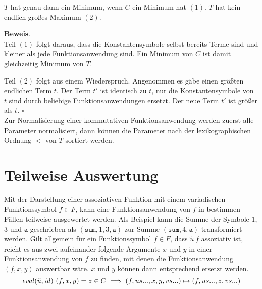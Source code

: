 \begin{lemma} \label{lemMinMax}
$T$ hat genau dann ein Minimum, wenn $C$ ein Minimum hat $(1)$. $T$ hat kein endlich großes Maximum $(2)$.
\end{lemma}

\textbf{Beweis}.\\
Teil $(1)$ folgt daraus, dass die Konstantensymbole selbst bereits Terme sind und kleiner als jede Funktionsanwendung sind. Ein Minimum von $C$ ist damit gleichzeitig Minimum von $T$.

Teil $(2)$ folgt aus einem Wiederspruch. Angenommen es gäbe einen größten endlichen Term $t$. Der Term $t'$ ist identisch zu $t$, nur die Konstantensymbole von $t$ sind durch beliebige Funktionsanwendungen ersetzt. Der neue Term $t'$ ist größer als $t$.
\hfill $\square$\\

Zur Normalisierung einer kommutativen Funktionsanwendung werden zuerst alle Parameter normalisiert, dann können die Parameter nach der lexikographischen Ordnung $<$ von $T$ sortiert werden. 

\section{Teilweise Auswertung} \label{subsecNormalKombinieren}

\begin{algorithm}
\DontPrintSemicolon
\caption{$\Const{combine} \colon T \rightarrow T$}\label{combine}

\end{algorithm}

Mit der Darstellung einer assoziativen Funktion mit einem variadischen Funktionssymbol $f \in F$, kann eine Funktionsanwendung von $f$ in bestimmen Fällen teilweise ausgewertet werden. Als Beispiel kann die Summe der Symbole $1$, $3$ und $\texttt{a}$ geschrieben als $(\texttt{sum}, 1, 3, \texttt{a})$ zur Summe $(\texttt{sum}, 4, \texttt{a})$ transformiert werden. 
Gilt allgemein für ein Funktionssymbol $f \in F$, dass $\tilde u~f$ assoziativ ist, reicht es aus zwei aufeinander folgende Argumente $x$ und $y$ in einer Funktionsanwendung von $f$ zu finden, mit denen die Funktionsanwendung $(f, x, y)$ auswertbar wäre. $x$ und $y$ können dann entsprechend ersetzt werden.
$$\mathit{eval}(\tilde u, \mathit{id})~(f, x, y) = z \in C \implies (f, us..., x, y, vs...) \mapsto (f, us..., z, vs...)$$

